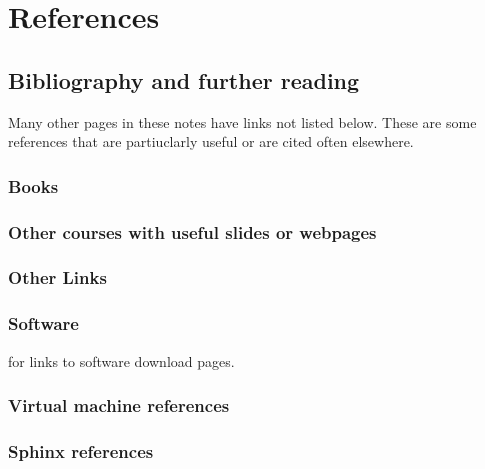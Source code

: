 \documentclass[letterpaper,10pt,english]{sphinxmanual}
\begin{document}
\chapter{References}
\label{index:toc-biblio}\label{index:references}

\section{Bibliography and further reading}
\label{biblio:bibliography-and-further-reading}\label{biblio::doc}\label{biblio:biblio}
Many other pages in these notes have links not listed below.  These are some
references that are partiuclarly useful or are cited often elsewhere.


\subsection{Books}
\label{biblio:biblio-books}\label{biblio:books}

\subsection{Other courses with useful slides or webpages}
\label{biblio:other-courses}\label{biblio:other-courses-with-useful-slides-or-webpages}

\subsection{Other Links}
\label{biblio:other-links}\label{biblio:biblio-links}

\subsection{Software}
\label{biblio:software}



{\hyperref[software_installation:software\string-installation]{}} for links to software download pages.




\subsection{Virtual machine references}
\label{biblio:biblio-vm}\label{biblio:virtual-machine-references}

\subsection{Sphinx references}
\label{biblio:sphinx-references}\label{biblio:biblio-sphinx}
\end{document}
